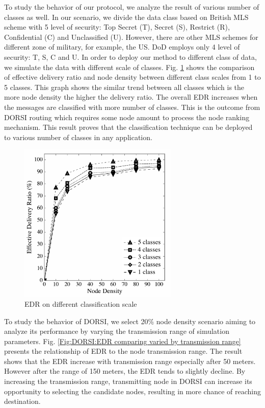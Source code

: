 To study the behavior of our protocol, we analyze the result of various number of classes as well. 
In our scenario, we divide the data class based on British MLS scheme with 5 level of security: Top Secret (T), Secret (S), Restrict (R), Confidential (C) and Unclassified (U). 
However, there are other MLS schemes for different zone of military, for example, the US. 
DoD employs only 4 level of security: T, S, C and U. In order to deploy our method to different class of data, we simulate the data with different scale of classes. 
Fig. \ref{Fig:DORSI:EDR on different classification scale} shows the comparison of effective delivery ratio and node density between different class scales from 1 to 5 classes. 
This graph shows the similar trend between all classes which is the more node density the higher the delivery ratio. 
The overall EDR increases when the messages are classified with more number of classes. 
This is the outcome from DORSI routing which requires some node amount to process the node ranking mechanism. 
This result proves that the classification technique can be deployed to various number of classes in any application.

\begin{figure}[!h]
\centering
\includegraphics[width=3in]{Graphs/EDRondifferentclassificationscale.pdf}
\caption{EDR on different classification scale}
\label{Fig:DORSI:EDR on different classification scale}
\end{figure}

To study the behavior of DORSI, we select 20\% node density scenario aiming to analyze its performance by varying the transmission range of simulation parameters. 
Fig. \ref{Fig:DORSI:EDR comparing varied by transmission range} presents the relationship of EDR to the node transmission range. 
The result shows that the EDR increase with transmission range especially after 50 meters. 
However after the range of 150 meters, the EDR tends to slightly decline. 
By increasing the transmission range, transmitting node in DORSI can increase its opportunity to selecting the candidate nodes, resulting in more chance of reaching destination.

